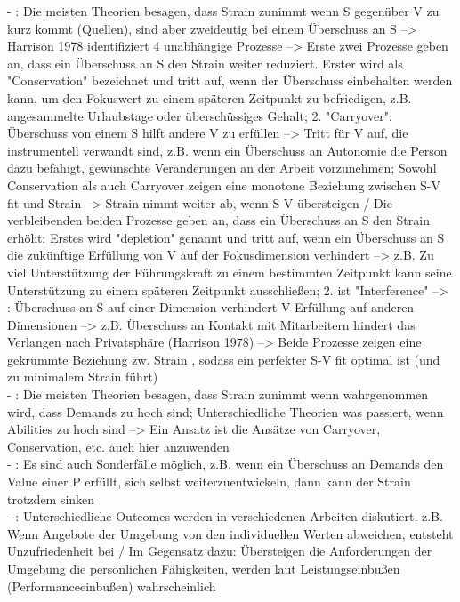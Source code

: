 - \cite[S. 3]{edwards:1996}: Die meisten Theorien besagen, dass Strain zunimmt wenn S gegenüber V zu kurz kommt (Quellen), sind aber zweideutig bei einem Überschuss an S --> Harrison 1978 identifiziert 4 unabhängige Prozesse --> Erste zwei Prozesse geben an, dass ein Überschuss an S den Strain weiter reduziert. Erster wird als "Conservation" bezeichnet und tritt auf, wenn der Überschuss einbehalten werden kann, um den Fokuswert zu einem späteren Zeitpunkt zu befriedigen, z.B. angesammelte Urlaubstage oder überschüssiges Gehalt; 2. "Carryover": Überschuss von einem S hilft andere V zu erfüllen --> Tritt für V auf, die instrumentell verwandt sind, z.B. wenn ein Überschuss an Autonomie die Person dazu befähigt, gewünschte Veränderungen an der Arbeit vorzunehmen; Sowohl Conservation als auch Carryover zeigen eine monotone Beziehung zwischen S-V fit und Strain --> Strain nimmt weiter ab, wenn S V übersteigen / Die verbleibenden beiden Prozesse geben an, dass ein Überschuss an S den Strain erhöht: Erstes wird "depletion" genannt und tritt auf, wenn ein Überschuss an S die zukünftige Erfüllung von V auf der Fokusdimension verhindert --> z.B. Zu viel Unterstützung der Führungskraft zu einem bestimmten Zeitpunkt kann seine Unterstützung zu einem späteren Zeitpunkt ausschließen; 2. ist "Interference" --> \cite[S. 4]{edwards:1996}: Überschuss an S auf einer Dimension verhindert V-Erfüllung auf anderen Dimensionen --> z.B. Überschuss an Kontakt mit Mitarbeitern hindert das Verlangen nach Privatsphäre (Harrison 1978) --> Beide Prozesse zeigen eine gekrümmte Beziehung zw. Strain , sodass ein perfekter S-V fit optimal ist (und zu minimalem Strain führt) \\
- \cite[S. 6]{edwards:1996}: Die meisten Theorien besagen, dass Strain zunimmt wenn wahrgenommen wird, dass Demands zu hoch sind; Unterschiedliche Theorien was passiert, wenn Abilities zu hoch sind --> Ein Ansatz ist die Ansätze von Carryover, Conservation, etc. auch hier anzuwenden \\
- \cite[S. 9]{edwards:1996}: Es sind auch Sonderfälle möglich, z.B. wenn ein Überschuss an Demands den Value einer P erfüllt, sich selbst weiterzuentwickeln, dann kann der Strain trotzdem sinken \\
- \cite[S. 4]{edwards:1990}: Unterschiedliche Outcomes werden in verschiedenen Arbeiten diskutiert, z.B. Wenn Angebote der Umgebung von den individuellen Werten abweichen, entsteht Unzufriedenheit bei \textcite{locke:1969} / Im Gegensatz dazu: Übersteigen die Anforderungen der Umgebung die persönlichen Fähigkeiten, werden laut \textcite{theoryOfBehaviorInOrganizations:1980} Leistungseinbußen (Performanceeinbußen) wahrscheinlich \\




